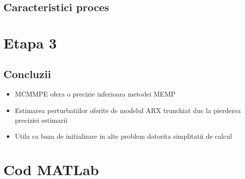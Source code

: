 \documentclass[12pt,english]{article}
\begin{document}
\subsection {Caracteristici proces }


\section {Etapa 3}




\newpage

\subsection {Concluzii}
\begin{itemize}
  \item MCMMPE ofera o precizie inferioara metodei MEMP
  \item Estimarea perturbatiilor oferite de modelul ARX trunchiat duc la pierderea preciziei estimarii
  \item Utila ca baza de initializare in alte problem datorita simplitatii de calcul
\end{itemize}

\section{Cod MATLab}
% 
\end{document}
